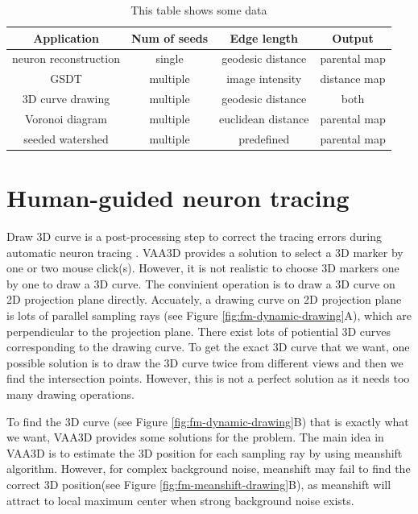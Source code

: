 \begin{table}
\begin{center}
\begin{tabular}{ | c | c | c | c |}
    \hline
    \textbf{Application} & \textbf{Num of seeds} & \textbf{Edge length} & \textbf{Output} \\ \hline
    neuron reconstruction & single & geodesic distance & parental map \\ \hline
    GSDT & multiple & image intensity & distance map  \\ \hline
    3D curve drawing & multiple & geodesic distance & both \\ \hline
    Voronoi diagram & multiple & euclidean distance & parental map  \\ \hline
    seeded watershed & multiple & predefined & parental map \\ \hline
  \end{tabular}
\end{center}
\caption{This table shows some data}
\label{tab:fm-app}
\end{table}

\section{Human-guided neuron tracing}
\label{sect:fm-3dcurve}
Draw 3D curve is a post-processing step to correct the tracing errors during automatic neuron tracing \cite{peng2011automatic, Xiao:2011}. VAA3D \cite{peng2010v3d} provides a solution to select a 3D marker by one or two mouse click(s). However, it is not realistic to choose 3D markers one by one to draw a 3D curve. The convinient operation is to draw a 3D curve on 2D projection plane directly. Accuately, a drawing curve on 2D projection plane is lots of parallel sampling rays (see Figure \ref{fig:fm-dynamic-drawing}A), which are perpendicular to the projection plane. There exist lots of potiential 3D curves corresponding to the drawing curve. To get the exact 3D curve that we want, one possible solution is to draw the 3D curve twice from different views and then we find the intersection points. However, this is not a perfect solution as it needs too many drawing operations.

To find the 3D curve (see Figure \ref{fig:fm-dynamic-drawing}B) that is exactly what we want,  VAA3D provides some solutions for the problem. The main idea in VAA3D is to estimate the 3D position for each sampling ray by using meanshift \cite{comaniciu2002mean} algorithm. However, for complex background noise, meanshift may fail to find the correct 3D position(see Figure \ref{fig:fm-meanshift-drawing}B), as meanshift will attract to local maximum center when strong background noise exists. 

